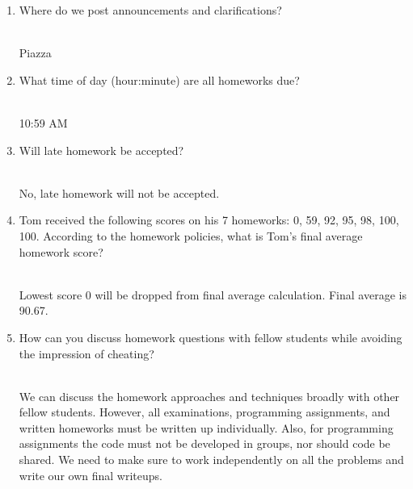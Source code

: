 \documentclass[a4paper]{article}
\theoremstyle{definition}
\newenvironment{soln}{
    \leavevmode\color{blue}\ignorespaces
}{}
\begin{document}
\begin{enumerate}

\item Where do we post announcements and clarifications?
\begin{soln}  
\\ Piazza
\end{soln}


\item What time of day (hour:minute) are all homeworks due?
\begin{soln} 
\\ 10:59 AM
\end{soln} 

\item Will late homework be accepted?
\begin{soln} 
\\ No, late homework will not be accepted.
\end{soln} 

\item Tom received the following scores on his 7 homeworks: 0, 59, 92, 95, 98, 100, 100.  According to the homework policies, what is Tom's final average homework score?
\begin{soln} 
\\ Lowest score 0 will be dropped from final average calculation. Final average is 90.67.
\end{soln} 

\item How can you discuss homework questions with fellow students while avoiding the impression of cheating?
\begin{soln} 
\\ We can discuss the homework approaches and techniques broadly with other fellow students. However, all examinations, programming assignments, and written homeworks must be written up individually. Also, for programming assignments the code must not be developed in groups, nor should code be shared. We need to make sure to work independently on all the problems and write our own final writeups.
\end{soln} 

\end{enumerate}
\end{document}
